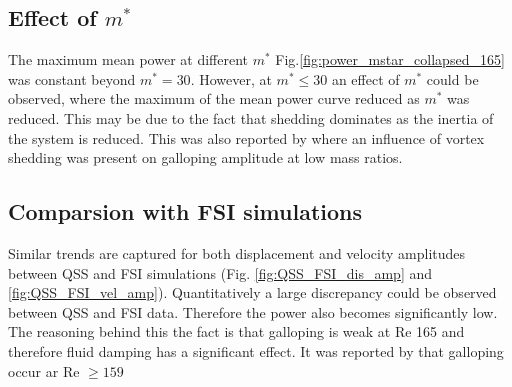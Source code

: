 \subsection{Effect of $m^*$}

 
The maximum mean power at different  $m^*$ Fig.\ref{fig:power_mstar_collapsed_165} was constant beyond $m^*=30$. However, at $m^* \leq 30$ an effect of $m^*$ could be observed, where the maximum of the mean power curve reduced as $m^*$ was reduced. This may be due to the fact that shedding dominates as the inertia of the system is reduced. This was also reported by \cite{Joly2012} where an influence of vortex shedding was present on galloping amplitude at low mass ratios. 


\subsection{Comparsion with FSI simulations}
 

 Similar trends are captured for both displacement and velocity amplitudes between QSS and FSI simulations (Fig. \ref{fig:QSS_FSI_dis_amp} and \ref{fig:QSS_FSI_vel_amp}). Quantitatively a large discrepancy  could be observed between QSS and FSI data. Therefore the power also becomes significantly low. The reasoning behind this the fact is that galloping is weak at Re 165 and therefore fluid damping has a significant effect. It was reported by \cite{Barrero-Gil2009} that galloping occur ar Re $\geq 159$
  
  
  











 

 
 
 

 
 



 
 
 
 
 
 
 
 
 
 
  
 
 
